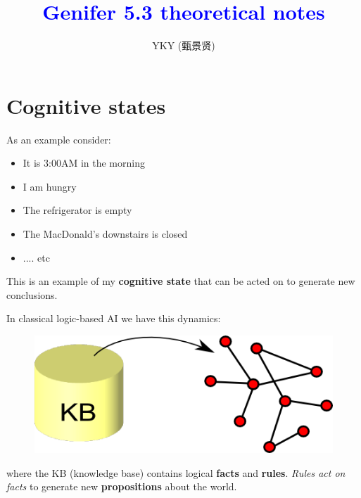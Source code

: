 \documentclass[12pt]{article}
\title{\textcolor{blue}{Genifer 5.3 theoretical notes}}
\author{YKY (甄景贤)}
\newcommand{\tab}{\hspace*{1cm}}
\begin{document}


{\let\newpage\relax\maketitle}

\maketitle
\setlength{\parindent}{0em}
\setlength{\parskip}{2.5ex plus0.5ex minus1.2ex}

\setlength{\abovecaptionskip}{-10ex}
\setlength{\belowcaptionskip}{-18ex}

\section{Cognitive states}

As an example consider:
\begin{itemize}
\item It is 3:00AM in the morning
\item I am hungry
\item The refrigerator is empty
\item The MacDonald's downstairs is closed
\item .... etc
\end{itemize}
This is an example of my \textbf{cognitive state} that can be acted on to generate new conclusions.

In classical logic-based AI we have this dynamics:
\begin{figure}[H]
\centering
\includegraphics[scale=0.5]{classical-LBAI.png}
\end{figure}
where the KB (knowledge base) contains logical \textbf{facts} and \textbf{rules}.  \textit{Rules act on facts} to generate new \textbf{propositions} about the world.
\end{document}
